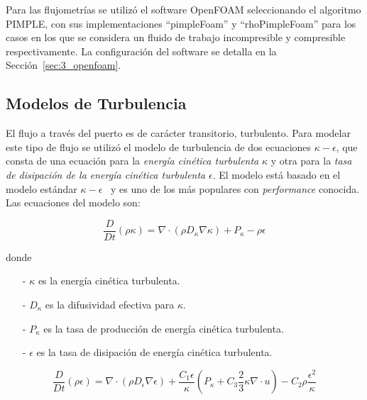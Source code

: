 Para las flujometrías se utilizó el software OpenFOAM seleccionando el algoritmo
PIMPLE, con sus implementaciones ``pimpleFoam'' y ``rhoPimpleFoam'' para los
casos en los que se considera un fluido de trabajo incompresible y compresible
respectivamente.
%
La configuración del software se detalla en la Sección~\ref{sec:3_openfoam}.

\subsection{Modelos de Turbulencia}
%
El flujo a través del puerto es de carácter transitorio, turbulento.
%
Para modelar este tipo de flujo se utilizó el modelo de turbulencia de dos
ecuaciones \emph{$\kappa-\epsilon$}\parencite{wilcox}, que consta de una
ecuación para la \emph{energía cinética turbulenta} $\kappa$ y otra para la
\emph{tasa de disipación de la energía cinética turbulenta} $\epsilon$.
%
El modelo está basado en el modelo estándar
$\kappa-\epsilon$~\parencite{launderSpalding} y es uno de los más populares con
\emph{performance} conocida.
%
Las ecuaciones del modelo son:

\begin{equation}\label{eq:k}
  \frac{D}{Dt}(\rho \kappa) = \nabla \cdot (\rho D_{\kappa}\nabla \kappa) + P_{\kappa} - \rho \epsilon
\end{equation}


donde

\begin{itemize}
  \item[-] $\kappa$ es la energía cinética turbulenta.
  \item[-] $D_{\kappa}$ es la difusividad efectiva para $\kappa$.
  \item[-] $P_{\kappa}$ es la tasa de producción de energía cinética turbulenta.
  \item[-] $\epsilon$ es la tasa de disipación de energía cinética turbulenta.
\end{itemize}


\begin{equation}\label{eq:k}
  \frac{D}{Dt}(\rho \epsilon) =
  \nabla \cdot (\rho D_{\epsilon}\nabla \epsilon) +
  \frac{C_{1}\epsilon}{\kappa} \left( P_{\kappa}+C_{3}\frac{2}{3}\kappa\nabla\cdot u \right) -
  C_{2}\rho\frac{\epsilon^{2}}{\kappa}
\end{equation}

